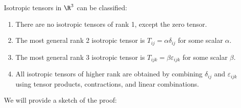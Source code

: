 \documentclass[a4paper]{article}
\begin{document}
Isotropic tensors in $\R^3$ can be classified:
\begin{thm}\leavevmode
  \begin{enumerate}
    \item There are no isotropic tensors of rank 1, except the zero tensor.
    \item The most general rank 2 isotropic tensor is $T_{ij} = \alpha \delta_{ij}$ for some scalar $\alpha$.
    \item The most general rank 3 isotropic tensor is $T_{ijk} = \beta \varepsilon_{ijk}$ for some scalar $\beta$.
    \item All isotropic tensors of higher rank are obtained by combining $\delta_{ij}$ and $\varepsilon_{ijk}$ using tensor products, contractions, and linear combinations.
  \end{enumerate}
\end{thm}
We will provide a sketch of the proof:
\end{document}
